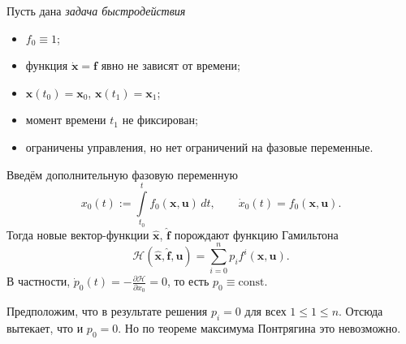 Пусть дана \emph{задача быстродействия}
\begin{itemize}[label=--]
  \item $ f_0 \equiv 1 $;
  \item функция $\dot{\mathbf{x}} = \mathbf{f} $ явно не зависят от
времени; 
\item $ \mathbf{x}(t_0) = \mathbf{x}_0 $, $ \mathbf{x}(t_1) = \mathbf{x}_1 $; 
\item момент времени $ t_1 $ не фиксирован;
 \item ограничены управления, но нет ограничений на фазовые переменные.
\end{itemize}

Введём дополнительную фазовую переменную  
\[
  x_0(t) := \int\limits_{t_0}^{t}f_0(\mathbf{x}, \mathbf{u})\,dt, \qquad
  \dot{x}_0(t) = f_0(\mathbf{x}, \mathbf{u}).
\]
Тогда новые вектор-функции $ \hat{\mathbf{x}} $, $ \hat{\mathbf{f}} $ порождают
функцию Гамильтона  
\[
  \mathscr{H}(\hat{\mathbf{x}}, \hat{\mathbf{f}}, \mathbf{u}) = \sum_{i=0}^n
  p_if^i(\mathbf{x}, \mathbf{u}).
\]
В частности, $ \dot{p}_0(t) = -\frac{\partial \mathscr H}{\partial x_0} = 0 $, то
есть $ p_0 \equiv \mathrm{const} $.

Предположим, что в результате решения $ p_i = 0 $ для всех $ 1 \leqslant 1
\leqslant n $. Отсюда 
вытекает, что и $ p_0 = 0 $. Но по теореме максимума Понтрягина это невозможно. 
